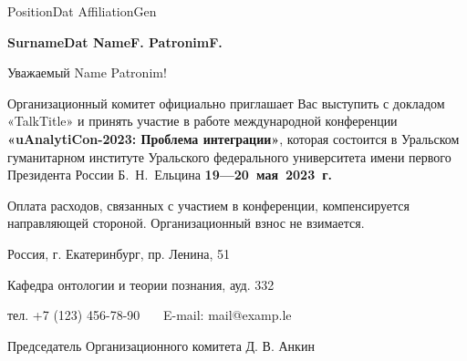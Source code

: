 \documentclass[12pt,a4paper,notitlepage]{article}
\begin{document}
	\pagestyle{empty}
	\noindent PositionDat AffiliationGen
	\begin{flushright}
		\textbf{SurnameDat NameF. PatronimF.}
	\end{flushright}
	
	\bigskip
	
	Уважаемый Name Patronim!
	
	\bigskip
	
	Организационный комитет официально приглашает Вас выступить с докладом «TalkTitle» и принять участие в работе международной конференции \textbf{«uAnalytiCon-2023: Проблема интеграции»}, которая состоится в Уральском гуманитарном институте Уральского федерального университета имени первого Президента России Б.~Н.~Ельцина \textbf{19—20~мая~2023~г.}
	
	\bigskip
	
	Оплата расходов, связанных с участием в конференции, компенсируется направляющей стороной. Организационный взнос не взимается.
	
	\bigskip
	
	\noindent Россия, г. Екатеринбург, пр. Ленина, 51 \
	 
	\noindent Кафедра онтологии и теории познания, ауд. 332
	
	\noindent тел. +7 (123) 456-78-90 \ \ \ E-mail: mail@examp.le
	
	\vspace*{20mm}
	
	\noindent Председатель Организационного комитета \hfill Д. В. Анкин
\end{document}
